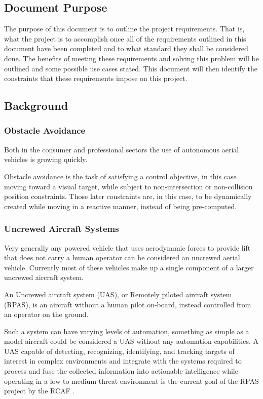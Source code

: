 \documentclass{article}
\begin{document}
	\subsection{Document Purpose}
	
	The purpose of this document is to outline the project requirements. That is, what the project is to accomplish once all of the requirements outlined in this document have been completed and to what standard they shall be considered done. The benefits of meeting these requirements and solving this problem will be outlined and some possible use cases stated. This document will then identify the constraints that these requirements impose on this project.
	
	\subsection{Background}
	
		\subsubsection{Obstacle Avoidance}
		
		Both in the consumer and professional sectors the use of autonomous aerial vehicles is growing quickly. 
		
		Obstacle avoidance is the task of satisfying a control objective, in this case moving toward a visual target, while subject to non-intersection or non-collision position constraints. Those later constraints are, in this case, to be dynamically created while moving in a reactive manner, instead of being pre-computed.
		
		\subsubsection{Uncrewed Aircraft Systems}
		
		Very generally any powered vehicle that uses aerodynamic forces to provide lift that does not carry a human operator can be considered an uncrewed aerial vehicle. Currently most of these vehicles make up a single component of a larger uncrewed aircraft system. 
		
		An Uncrewed aircraft system (UAS), or Remotely piloted aircraft system (RPAS), is an aircraft without a human pilot on-board, instead controlled from an operator on the ground. 
		
		Such a system can have varying levels of automation, something as simple as a model aircraft could be considered a UAS without any automation capabilities. A UAS capable of detecting, recognizing, identifying, and tracking targets of interest in complex environments and integrate with the systems required to process and fuse the collected information into actionable intelligence while operating in a low-to-medium threat environment is the current goal of the RPAS project by the RCAF \cite{RPAS}. 
		
\end{document}
